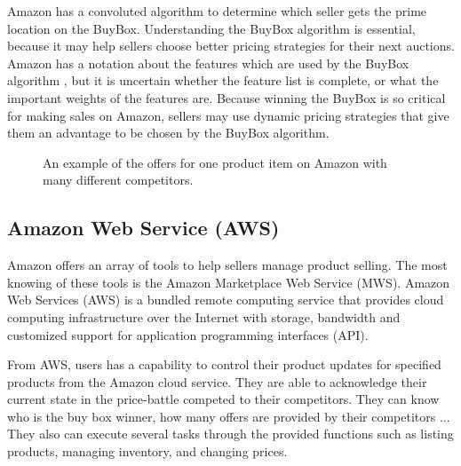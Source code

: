{Amazon has a convoluted algorithm to determine which seller gets the prime location on the BuyBox. Understanding the BuyBox algorithm is essential, because it may help sellers choose better pricing strategies for their next auctions.  Amazon has a notation about the features which are used by the BuyBox algorithm \cite{amazon17}, but it is uncertain whether the feature list is complete, or what the important weights of the features are. Because winning the BuyBox is so critical for making sales on Amazon,  sellers may use dynamic pricing strategies that give them an advantage to be chosen by the BuyBox algorithm.

\begin{figure}[!h]
	\begin{center}
	\end{center}
	\caption{\label{fig:exampleoffer}An example of the offers for one product item on Amazon with many different competitors.}
\end{figure}


\subsection{Amazon Web Service (AWS)}
\label{sec:awsData}
 Amazon offers an array of tools to help sellers manage product selling. The most knowing of these tools is the Amazon Marketplace Web Service (MWS). Amazon Web Services (AWS) is a bundled remote computing service that provides cloud computing infrastructure over the Internet with storage, bandwidth and customized support for application programming interfaces (API).

From AWS, users has a capability to control their product updates for specified products from the Amazon cloud service. They are able to acknowledge their current state in the price-battle competed to their competitors. They can know who is the buy box winner, how many offers are provided by their competitors ... They also can execute several tasks through the provided functions such as listing products, managing inventory, and changing prices. 

}
